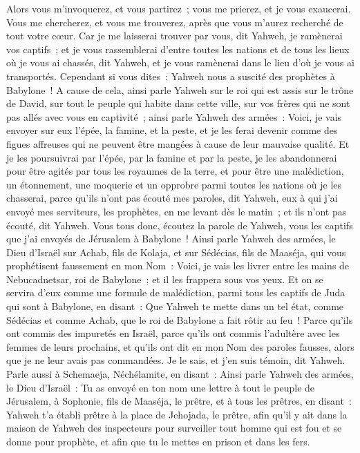 \begin{multicols}{2}
Alors vous m'invoquerez, et vous partirez~; vous me prierez, et je vous exaucerai.
Vous me chercherez, et vous me trouverez, après que vous m'aurez recherché de tout votre cœur.
Car je me laisserai trouver par vous, dit Yahweh, je ramènerai vos captifs~; et je vous rassemblerai d'entre toutes les nations et de tous les lieux où je vous ai chassés, dit Yahweh, et je vous ramènerai dans le lieu d'où je vous ai transportés.
Cependant si vous dites~: Yahweh nous a suscité des prophètes à Babylone~!
 A cause de cela, ainsi parle Yahweh sur le roi qui est assis sur le trône de David, sur tout le peuple qui habite dans cette ville, sur vos frères qui ne sont pas allés avec vous en captivité~;
ainsi parle Yahweh des armées~: Voici, je vais envoyer sur eux l'épée, la famine, et la peste, et je les ferai devenir comme des figues affreuses qui ne peuvent être mangées à cause de leur mauvaise qualité.
Et je les poursuivrai par l'épée, par la famine et par la peste, je les abandonnerai pour être agités par tous les royaumes de la terre, et pour être une malédiction, un étonnement, une moquerie et un opprobre parmi toutes les nations où je les chasserai,
parce qu'ils n'ont pas écouté mes paroles, dit Yahweh, eux à qui j'ai envoyé mes serviteurs, les prophètes, en me levant dès le matin~; et ils n'ont pas écouté, dit Yahweh.
Vous tous donc, écoutez la parole de Yahweh, vous les captifs que j'ai envoyés de Jérusalem à Babylone~!
Ainsi parle Yahweh des armées, le Dieu d'Israël sur Achab, fils de Kolaja, et sur Sédécias, fils de Maaséja, qui vous prophétisent faussement en mon Nom~: Voici, je vais les livrer entre les mains de Nebucadnetsar, roi de Babylone~; et il les frappera sous vos yeux.
Et on se servira d'eux comme une formule de malédiction, parmi tous les captifs de Juda qui sont à Babylone, en disant~: Que Yahweh te mette dans un tel état, comme Sédécias et comme Achab, que le roi de Babylone a fait rôtir au feu~!
Parce qu'ils ont commis des impuretés en Israël, parce qu'ils ont commis l'adultère avec les femmes de leurs prochains, et qu'ils ont dit en mon Nom des paroles fausses, alors que je ne leur avais pas commandées. Je le sais, et j'en suis témoin, dit Yahweh.
Parle aussi à Schemaeja, Néchélamite, en disant~:
Ainsi parle Yahweh des armées, le Dieu d'Israël~: Tu as envoyé en ton nom une lettre à tout le peuple de Jérusalem, à Sophonie, fils de Maaséja, le prêtre, et à tous les prêtres, en disant~:
Yahweh t'a établi prêtre à la place de Jehojada, le prêtre, afin qu'il y ait dans la maison de Yahweh des inspecteurs pour surveiller tout homme qui est fou et se donne pour prophète, et afin que tu le mettes en prison et dans les fers.

\end{multicols}
